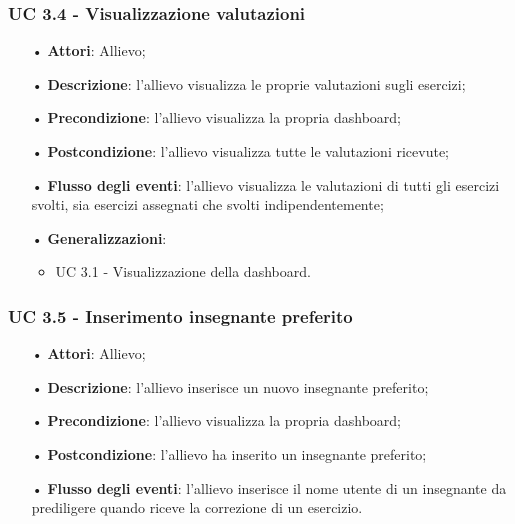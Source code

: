 \subsubsection{UC 3.4 - Visualizzazione valutazioni}
\begin{itemize}
\item[•]\textbf{Attori}: Allievo;
\item[•]\textbf{Descrizione}: l'allievo visualizza le proprie valutazioni sugli esercizi;
\item[•]\textbf{Precondizione}: l'allievo visualizza la propria dashboard;
\item[•]\textbf{Postcondizione}: l'allievo visualizza tutte le valutazioni ricevute;
\item[•]\textbf{Flusso degli eventi}: l'allievo visualizza le valutazioni di tutti gli esercizi svolti, sia esercizi assegnati che svolti indipendentemente;
\item[•]\textbf{Generalizzazioni}:
\begin{itemize}
\item UC 3.1 - Visualizzazione della dashboard.
\end{itemize}
\end{itemize}

\subsubsection{UC 3.5 - Inserimento insegnante preferito}
\begin{itemize}
\item[•]\textbf{Attori}: Allievo;
\item[•]\textbf{Descrizione}: l'allievo inserisce un nuovo insegnante preferito;
\item[•]\textbf{Precondizione}: l'allievo visualizza la propria dashboard;
\item[•]\textbf{Postcondizione}: l'allievo ha inserito un insegnante preferito;
\item[•]\textbf{Flusso degli eventi}: l'allievo inserisce il nome utente di un insegnante da prediligere quando riceve la correzione di un esercizio.
\end{itemize}

